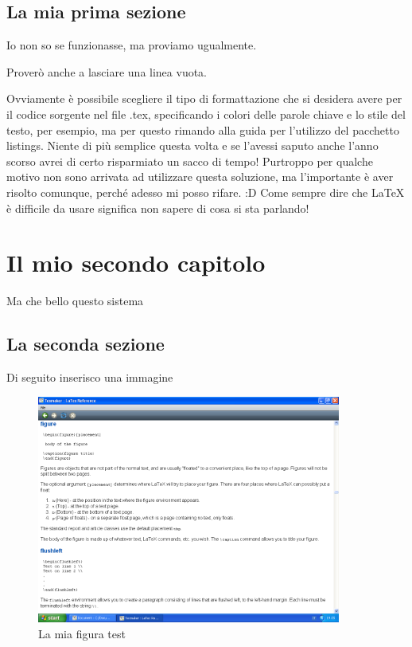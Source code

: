 \documentclass [a4paper,12pt,openany]{book}
\begin{document}
\section{La mia prima sezione}

Io non so se funzionasse, ma proviamo ugualmente.

Proverò anche a lasciare una linea vuota. 

Ovviamente è possibile scegliere il tipo di formattazione che si desidera avere per il codice sorgente nel file .tex, specificando i colori delle parole chiave e lo stile del testo, per esempio, ma per questo rimando alla guida per l'utilizzo del pacchetto listings. Niente di più semplice questa volta e se l'avessi saputo anche l'anno scorso avrei di certo risparmiato un sacco di tempo! Purtroppo per qualche motivo non sono arrivata ad utilizzare questa soluzione, ma l'importante è aver risolto comunque, perché adesso mi posso rifare. :D Come sempre dire che LaTeX è difficile da usare significa non sapere di cosa si sta parlando!

\chapter{Il mio secondo capitolo}
Ma che bello questo sistema
\section{La seconda sezione}

Di seguito inserisco una immagine
	\begin{figure}[htbp]
	\centering
	\includegraphics[width=10cm]{test.png}
	\caption{La mia figura test}\label{figura1}
	\end{figure}
\clearpage
\end{document}
